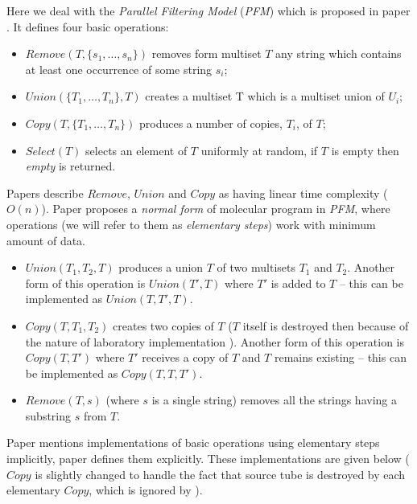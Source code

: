 Here we deal with the \emph{Parallel Filtering Model} (\emph{PFM}) which is proposed in paper \cite{Amos:1996}. It defines four basic operations:
\begin{itemize}
	\item $Remove(T, \{s_1, \dots, s_n\})$ removes form multiset $T$ any string which contains at least one occurrence of some string $s_i$;
	\item $Union(\{T_1, \dots, T_n\}, T)$ creates a multiset T which is a multiset union of $U_i$;
	\item $Copy(T, \{T_1, \dots, T_n\})$ produces a number of copies, $T_i$, of $T$;
	\item $Select(T)$ selects an element of $T$ uniformly at random, if $T$ is empty then \emph{empty} is returned.
\end{itemize}
Papers \cite{Amos:1997, Amos:2003:Book} describe $Remove$, $Union$ and $Copy$ as having linear time complexity ($O(n)$). 
Paper \cite{Katsanyi:2003} proposes a \emph{normal form} of molecular program in \emph{PFM}, where operations (we will refer to them as \emph{elementary steps}) work with minimum amount of data.
\begin{itemize}
	\item $Union(T_1, T_2, T)$ produces a union $T$ of two multisets $T_1$ and $T_2$. Another form of this operation is $Union(T', T)$ where $T'$ is added to $T$ -- this can be implemented as $Union(T, T', T)$.
	\item $Copy(T, T_1, T_2)$ creates two copies of $T$ ($T$ itself is destroyed then because of the nature of laboratory implementation \cite{Amos:1996}). Another form of this operation is $Copy(T, T')$ where $T'$ receives a copy of $T$ and $T$ remains existing -- this can be implemented as $Copy(T, T, T')$.
	\item $Remove(T, s)$ (where $s$ is a single string) removes all the strings having a substring $s$ from $T$.
\end{itemize}

Paper \cite{Amos:1997} mentions implementations of basic operations using elementary steps implicitly, paper \cite{Katsanyi:2003} defines them explicitly. These implementations are given below ($Copy$ is slightly changed to handle the fact that source tube is destroyed by each elementary $Copy$, which is ignored by \cite{Katsanyi:2003}).



